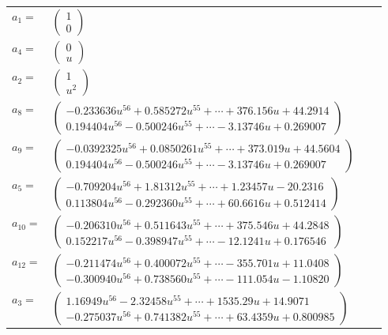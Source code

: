 \documentclass[1p]{elsarticle_modified}
\theoremstyle{definition}
\begin{document}
\begin{tabular}{m{7pt} m{180pt} m{7pt} m{180pt} }
\flushright $a_{1}=$&$\begin{pmatrix}1\\0\end{pmatrix}$ \\
\flushright $a_{4}=$&$\begin{pmatrix}0\\u\end{pmatrix}$ \\
\flushright $a_{2}=$&$\begin{pmatrix}1\\u^2\end{pmatrix}$ \\
\flushright $a_{8}=$&$\begin{pmatrix}-0.233636 u^{56}+0.585272 u^{55}+\cdots+376.156 u+44.2914\\0.194404 u^{56}-0.500246 u^{55}+\cdots-3.13746 u+0.269007\end{pmatrix}$ \\
\flushright $a_{9}=$&$\begin{pmatrix}-0.0392325 u^{56}+0.0850261 u^{55}+\cdots+373.019 u+44.5604\\0.194404 u^{56}-0.500246 u^{55}+\cdots-3.13746 u+0.269007\end{pmatrix}$ \\
\flushright $a_{5}=$&$\begin{pmatrix}-0.709204 u^{56}+1.81312 u^{55}+\cdots+1.23457 u-20.2316\\0.113804 u^{56}-0.292360 u^{55}+\cdots+60.6616 u+0.512414\end{pmatrix}$ \\
\flushright $a_{10}=$&$\begin{pmatrix}-0.206310 u^{56}+0.511643 u^{55}+\cdots+375.546 u+44.2848\\0.152217 u^{56}-0.398947 u^{55}+\cdots-12.1241 u+0.176546\end{pmatrix}$ \\
\flushright $a_{12}=$&$\begin{pmatrix}-0.211474 u^{56}+0.400072 u^{55}+\cdots-355.701 u+11.0408\\-0.300940 u^{56}+0.738560 u^{55}+\cdots-111.054 u-1.10820\end{pmatrix}$ \\
\flushright $a_{3}=$&$\begin{pmatrix}1.16949 u^{56}-2.32458 u^{55}+\cdots+1535.29 u+14.9071\\-0.275037 u^{56}+0.741382 u^{55}+\cdots+63.4359 u+0.800985\end{pmatrix}$ \\

\end{tabular}
\end{document}
